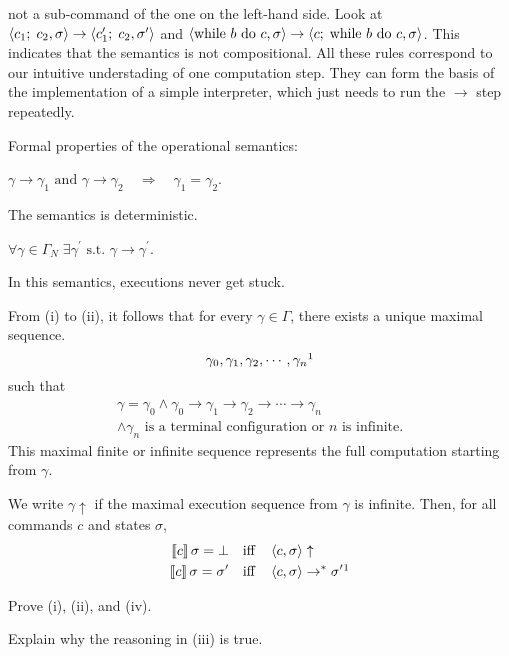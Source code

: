 \begin{enumcirc}
	not a sub-command of the one on the left-hand side.
	Look at
	$ \left\langle c_1 ;\; c_2, \sigma \right\rangle
		\rightarrow
		\left\langle c_1^\prime ;\; c_2, \sigma^\prime \right\rangle $
	and
	$ \left\langle \textrm{while } b \textrm{ do } c, \sigma \right\rangle
		\rightarrow
		\left\langle c ;\; \textrm{while } b \textrm{ do } c, \sigma \right\rangle $.
	This indicates that the semantics is not compositional.
	All these rules correspond to our intuitive understading of one computation
	step.
	They can form the basis of the implementation of a simple interpreter, which
	just needs to run the $\rightarrow$ step repeatedly.
	\item
	Formal properties of the operational semantics:
	\begin{enumrm}
		\item
		$\gamma \rightarrow \gamma_1
			\textrm{ and }
			\gamma \rightarrow \gamma_2
			\quad\Rightarrow\quad
			\gamma_1 = \gamma_2$.

		The semantics is deterministic.
		\item
		$\forall \gamma \in \Gamma_N \; \exists \gamma^\prime
			\textrm{ s.t. }
			\gamma \rightarrow \gamma^\prime$.

		In this semantics, executions never get stuck.
		\item
		From (i) to (ii), it follows that for every
		$\gamma \in \Gamma$,
		there exists a unique maximal sequence.
		\[
			\gamma_0, \gamma_1, \gamma_2, \cdots, \gamma_n\footnotemark
		\]
		such that
		\begin{multline*}
			\gamma = \gamma_0 \wedge
			\gamma_0 \rightarrow \gamma_1 \rightarrow \gamma_2 \rightarrow \cdots
			\rightarrow \gamma_n
			\\ \wedge \gamma_n \textrm{ is a terminal configuration or } n \textrm{ is infinite}.
		\end{multline*}
		This maximal finite or infinite sequence represents the full computation
		starting from $\gamma$.
		\item
		We write $\gamma \uparrow$ if the maximal execution sequence from $\gamma$ is
		infinite.
		Then, for all commands $c$ and states $\sigma$,
		\begin{align*}
			\bbrackets{c}\sigma = \bot          &
			\quad \textrm{iff} \quad
			\chevrons{c, \sigma} \uparrow         \\
			\bbrackets{c}\sigma = \sigma^\prime &
			\quad \textrm{iff} \quad
			\chevrons{c, \sigma} \rightarrow^* \sigma^\prime \footnotemark
		\end{align*}
	\end{enumrm}
	\begin{exercise}
		Prove (i), (ii), and (iv).
	\end{exercise}
	\begin{exercise}
		Explain why the reasoning in (iii) is true.
	\end{exercise}
\end{enumcirc}

